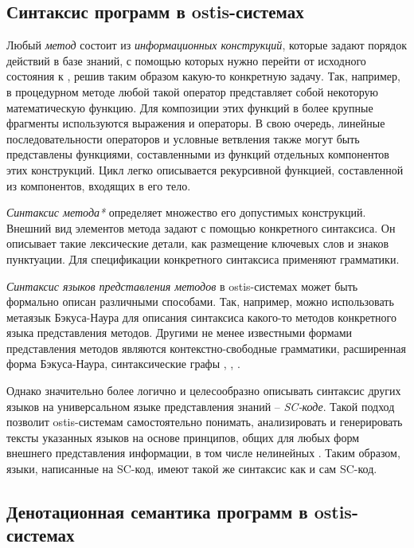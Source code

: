 \subsection{Синтаксис программ в ostis-системах}
\label{sec_programs_method_syntax}

Любый \textit{метод} состоит из \textit{информационных конструкций}, которые задают порядок действий в базе знаний, с помощью которых нужно перейти от исходного состояния к , решив таким образом какую-то конкретную задачу. Так, например, в процедурном методе любой такой оператор представляет собой некоторую математическую функцию. Для композиции этих функций в более крупные фрагменты используются выражения и операторы. В свою очередь, линейные последовательности операторов и условные ветвления также могут быть представлены функциями, составленными из функций отдельных компонентов этих конструкций. Цикл легко описывается рекурсивной функцией, составленной из компонентов, входящих в его тело.

\textit{Синтаксис метода*} определяет множество его допустимых конструкций. Внешний вид элементов метода задают с помощью конкретного синтаксиса. Он описывает такие лексические детали, как размещение ключевых слов и знаков пунктуации. Для спецификации конкретного синтаксиса применяют грамматики.

\textit{Синтаксис языков представления методов} в ostis-системах может быть формально описан различными способами. Так, например, можно использовать метаязык Бэкуса-Наура для описания синтаксиса какого-то методов конкретного языка представления методов. Другими не менее известными формами представления методов являются контекстно-свободные грамматики, расширенная форма Бэкуса-Наура, синтаксические графы \cite{Sebesta2012}, \cite{Scott2006}, \cite{Scott1972}.

Однако значительно более логично и целесообразно описывать синтаксис других языков на универсальном языке представления знаний -- \textit{SC-коде}. Такой подход позволит ostis-системам самостоятельно понимать, анализировать и генерировать тексты указанных языков на основе принципов, общих для любых форм внешнего представления информации, в том числе нелинейных \cite{Petrov1978}. Таким образом, языки, написанные на SC-код, имеют такой же синтаксис как и сам SC-код.

\subsection{Денотационная семантика программ в ostis-системах}
\label{sec_programs_method_den_semantic}

